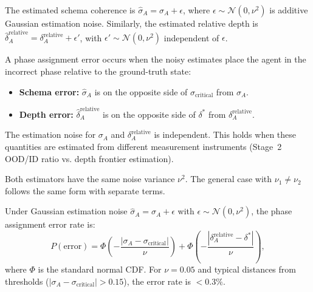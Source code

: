 
\begin{definition}
The estimated schema coherence is $\hat{\sigma}_A = \sigma_A + \epsilon$,
where $\epsilon \sim \mathcal{N}(0, \nu^2)$ is additive Gaussian
estimation noise. Similarly, the estimated relative depth is
$\hat{\delta}_A^{\text{relative}} = \delta_A^{\text{relative}} + \epsilon'$,
with $\epsilon' \sim \mathcal{N}(0, \nu^2)$ independent of $\epsilon$.
\end{definition}

\begin{definition}
A phase assignment error occurs when the noisy estimates place the
agent in the incorrect phase relative to the ground-truth state:
\begin{itemize}[nosep]
\item \textbf{Schema error:} $\hat{\sigma}_A$ is on the opposite side
  of $\sigma_{\text{critical}}$ from $\sigma_A$.
\item \textbf{Depth error:} $\hat{\delta}_A^{\text{relative}}$ is on
  the opposite side of $\delta^*$ from $\delta_A^{\text{relative}}$.
\end{itemize}
\end{definition}

\begin{assumption}
The estimation noise for $\sigma_A$ and $\delta_A^{\text{relative}}$
is independent. This holds when these quantities are estimated from
different measurement instruments (Stage~2 OOD/ID ratio vs. depth
frontier estimation).
\end{assumption}

\begin{assumption}
Both estimators have the same noise variance $\nu^2$. The general case
with $\nu_1 \neq \nu_2$ follows the same form with separate terms.
\end{assumption}

\begin{proposition}
\label{prop:noise}
Under Gaussian estimation noise $\hat{\sigma}_A = \sigma_A + \epsilon$
with $\epsilon \sim \mathcal{N}(0, \nu^2)$, the phase assignment error
rate is:
\[
P(\text{error}) = \Phi\!\left(-\frac{|\sigma_A - \sigma_{\text{critical}}|}{\nu}\right)
+ \Phi\!\left(-\frac{|\delta_A^{\text{relative}} - \delta^*|}{\nu}\right),
\]
where $\Phi$ is the standard normal CDF. For $\nu = 0.05$ and typical
distances from thresholds ($|\sigma_A - \sigma_{\text{critical}}| > 0.15$),
the error rate is $< 0.3\%$.
\end{proposition}

